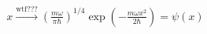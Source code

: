 \documentclass[preview]{standalone}
\begin{document}
\begin{align*}
x \overset{\text{wtf???}}{\to}\left(  \frac{m\omega}{\pi\hbar} \right)^{1/4} \exp\left( -\frac{m\omega x^2}{2\hbar} \right)=\psi(x)
\end{align*}
\end{document}
